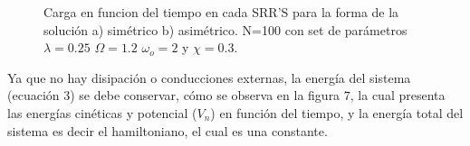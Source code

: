 \documentclass[11pt,letterpaper,twocolumn]{article}
\begin{document}
\begin{figure}[h!]
\centering
{} 
\caption{Carga en funcion del tiempo en cada SRR'S para la forma de la solución a) simétrico b) asimétrico. N=100 con set de parámetros $\lambda=0.25$ $\Omega=1.2$ $\omega_{o}=2$ y $\chi=0.3$.}
\end{figure}
\par 
Ya que no hay disipación o conducciones externas, la energía del sistema (ecuación 3) se debe conservar, cómo se observa en la figura $7$, la cual presenta las energías cinéticas y potencial ($V_{n}$) en función del tiempo, y la energía total del sistema es decir el hamiltoniano, el cual es una constante.
\end{document}
